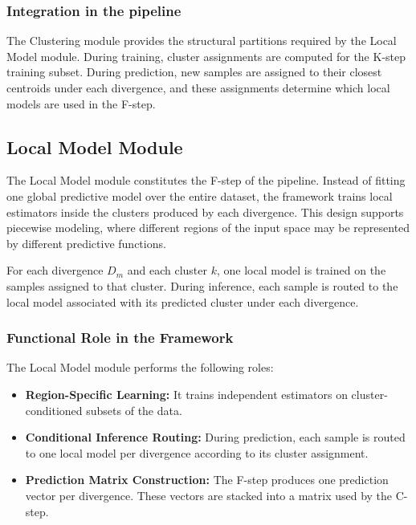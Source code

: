 \subsubsection*{Integration in the \KFCProcedure{} pipeline}

The Clustering module provides the structural partitions required by the Local Model module. During training, cluster assignments are computed for the K-step training subset. During prediction, new samples are assigned to their closest centroids under each divergence, and these assignments determine which local models are used in the F-step.

\subsection{Local Model Module}

\hs The Local Model module constitutes the F-step of the \KFCProcedure{} pipeline. Instead of fitting one global predictive model over the entire dataset, the framework trains local estimators inside the clusters produced by each divergence. This design supports piecewise modeling, where different regions of the input space may be represented by different predictive functions.

For each divergence $D_m$ and each cluster $k$, one local model is trained on the samples assigned to that cluster. During inference, each sample is routed to the local model associated with its predicted cluster under each divergence.

\subsubsection*{Functional Role in the Framework}

The Local Model module performs the following roles:

\begin{itemize}
    \item \textbf{Region-Specific Learning:} It trains independent estimators on cluster-conditioned subsets of the data.

    \item \textbf{Conditional Inference Routing:} During prediction, each sample is routed to one local model per divergence according to its cluster assignment.

    \item \textbf{Prediction Matrix Construction:} The F-step produces one prediction vector per divergence. These vectors are stacked into a matrix used by the C-step.
\end{itemize}

